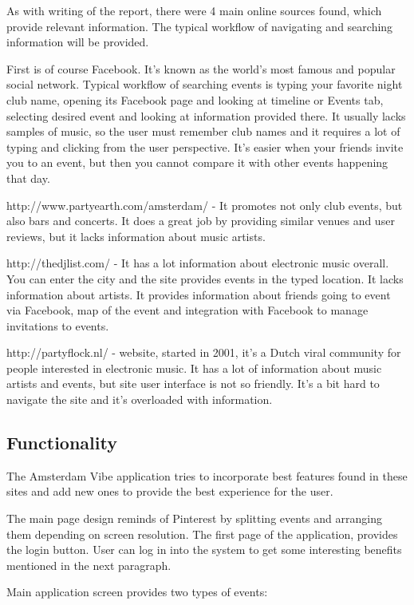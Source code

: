 \documentclass[12pt, a4paper, lithuanian]{article}
\begin{document}
  As with writing of the report, there were 4 main online sources found, which provide relevant information. The typical workflow of navigating and searching information will be provided.

  First is of course Facebook. It's known as the world's most famous and popular social network. Typical workflow of searching events is typing your favorite night club name, opening its Facebook page and looking at timeline or Events tab, selecting desired event and looking at information provided there. It usually lacks samples of music, so the user must remember club names and it requires a lot of typing and clicking from the user perspective. It's easier when your friends invite you to an event, but then you cannot compare it with other events happening that day.

  http://www.partyearth.com/amsterdam/ - It promotes not only club events, but also bars and concerts. It does a great job by providing similar venues and user reviews, but it lacks information about music artists.

  http://thedjlist.com/ - It has a lot information about electronic music overall. You can enter the city and the site provides events in the typed location. It lacks information about artists. It provides information about friends going to event via Facebook, map of the event and integration with Facebook to manage invitations to events. 

  http://partyflock.nl/ - website, started in 2001, it's a Dutch viral community for people interested in electronic music. It has a lot of information about music artists and events, but site user interface is not so friendly. It's a bit hard to navigate the site and it's overloaded with information.

\subsection{Functionality}

  The Amsterdam Vibe application tries to incorporate best features found in these sites and add new ones to provide the best experience for the user.

  The main page design reminds of Pinterest by splitting events and arranging them depending on screen resolution. The first page of the application, provides the login button. User can log in into the system to get some interesting benefits mentioned in the next paragraph.

  Main application screen provides two types of events:
\end{document}
